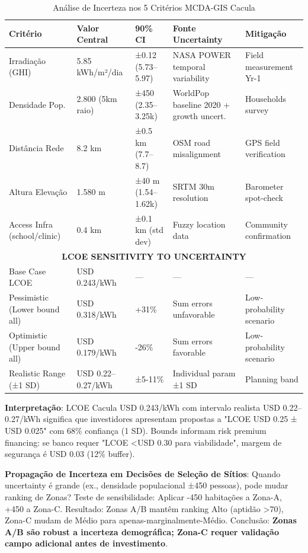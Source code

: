 \documentclass[12pt, a4paper]{article}
\begin{document}
{{{{{{{{{{{{\begin{table}[H]
\centering
\caption{Análise de Incerteza nos 5 Critérios MCDA-GIS Cacula}
\label{tab:uncertainty_bounds}
\small
\begin{tabular}{|l|l|l|l|l|}
\hline
\textbf{Critério} & \textbf{Valor Central} & \textbf{90\% CI} & \textbf{Fonte Uncertainty} & \textbf{Mitigação} \\
\hline
Irradiação (GHI) & 5.85 kWh/m²/dia & ±0.12 (5.73–5.97) & NASA POWER temporal variability & Field measurement Yr-1 \\
Densidade Pop. & 2.800 (5km raio) & ±450 (2.35–3.25k) & WorldPop baseline 2020 + growth uncert. & Households survey \\
Distância Rede & 8.2 km & ±0.5 km (7.7–8.7) & OSM road misalignment & GPS field verification \\
Altura Elevação & 1.580 m & ±40 m (1.54–1.62k) & SRTM 30m resolution & Barometer spot-check \\
Access Infra (school/clinic) & 0.4 km & ±0.1 km (std dev) & Fuzzy location data & Community confirmation \\
\hline
\multicolumn{5}{|c|}{\textbf{LCOE SENSITIVITY TO UNCERTAINTY}} \\
\hline
Base Case LCOE & USD 0.243/kWh & — & — & — \\
Pessimistic (Lower bound all) & USD 0.318/kWh & +31\% & Sum errors unfavorable & Low-probability scenario \\
Optimistic (Upper bound all) & USD 0.179/kWh & -26\% & Sum errors favorable & Low-probability scenario \\
Realistic Range (±1 SD) & USD 0.22–0.27/kWh & ±5-11\% & Individual param ±1 SD & Planning band \\
\hline
\end{tabular}
\end{table}

\textbf{Interpretação}: LCOE Cacula USD 0.243/kWh com intervalo realista USD 0.22–0.27/kWh significa que investidores apresentam propostas a "LCOE USD 0.25 ± USD 0.025" com 68\% confiança (1 SD). Bounds informam risk premium financing: se banco requer "LCOE <USD 0.30 para viabilidade", margem de segurança é USD 0.03 (12\% buffer).

\textbf{Propagação de Incerteza em Decisões de Seleção de Sítios}: Quando uncertainty é grande (ex., densidade populacional ±450 pessoas), pode mudar ranking de Zonas? Teste de sensibilidade: Aplicar -450 habitações a Zona-A, +450 a Zona-C. Resultado: Zonas A/B mantêm ranking Alto (aptidão >70), Zona-C mudam de Médio para apenas-marginalmente-Médio. Conclusão: \textbf{Zonas A/B são robust a incerteza demográfica; Zona-C requer validação campo adicional antes de investimento}.

}}}}}}}}}}}}
\end{document}
